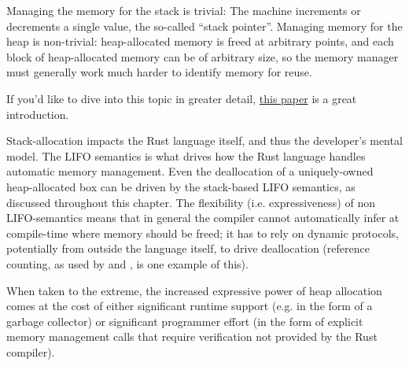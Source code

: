 
Managing the memory for the stack is trivial: The machine increments or decrements a single value, the so-called \enquote{stack pointer}.
Managing memory for the heap is non-trivial: heap-allocated memory is freed at arbitrary points, and each block of heap-allocated memory 
can be of arbitrary size, so the memory manager must generally work much harder to identify memory for reuse.

\blank

If you'd like to dive into this topic in greater detail, \href{http://citeseerx.ist.psu.edu/viewdoc/summary?doi=10.1.1.143.4688}{this paper}
is a great introduction.


Stack-allocation impacts the Rust language itself, and thus the developer's mental model. The LIFO semantics is what drives how the 
Rust language handles automatic memory management. Even the deallocation of a uniquely-owned heap-allocated box can be driven by the 
stack-based LIFO semantics, as discussed throughout this chapter. The flexibility (i.e. expressiveness) of non LIFO-semantics means that 
in general the compiler cannot automatically infer at compile-time where memory should be freed; it has to rely on dynamic protocols, 
potentially from outside the language itself, to drive deallocation (reference counting, as used by  and , is 
one example of this).

\blank

When taken to the extreme, the increased expressive power of heap allocation comes at the cost of either significant runtime support 
(e.g. in the form of a garbage collector) or significant programmer effort (in the form of explicit memory management calls that 
require verification not provided by the Rust compiler).
